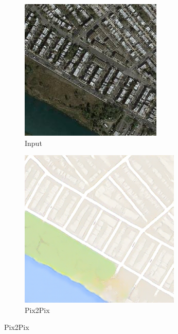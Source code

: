 \begin{figure}
	\centering
	\begin{subfigure}[t]{.2\textwidth}
	  \caption*{Input}
	  \centering
	  \includegraphics[width=\linewidth]{images/cycleGanResults/Satelite6_Or_Ld120_E100_Lr0002.jpg}
	\end{subfigure}
	\begin{subfigure}[t]{.2\textwidth}
	  \caption*{Pix2Pix}
	  \centering
	  \includegraphics[width=\linewidth]{images/Vergleich/p3.png}

\end{subfigure}
\end{figure}
